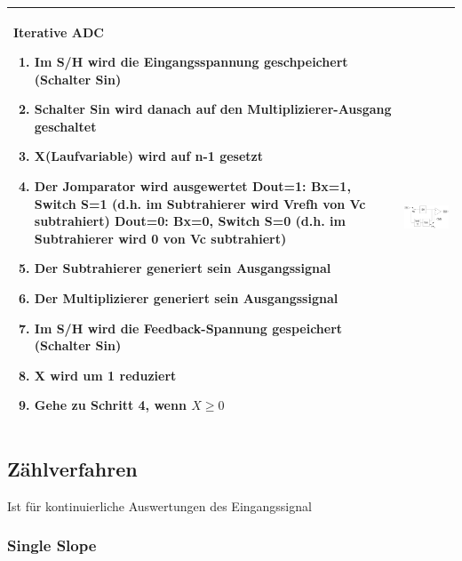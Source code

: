 \begin{longtable}{|p{12cm}|c|}
  {\textbf{Iterative ADC} \newline
  \begin{enumerate}
    \item Im S/H wird die Eingangsspannung geschpeichert (Schalter Sin)
    \item Schalter Sin wird danach auf den Multiplizierer-Ausgang geschaltet
    \item X(Laufvariable) wird auf n-1 gesetzt
    \item Der Jomparator wird ausgewertet\newline
      Dout=1: Bx=1, Switch S=1 (d.h. im Subtrahierer wird Vrefh von Vc
      subtrahiert)\newline
      Dout=0: Bx=0, Switch S=0 (d.h. im Subtrahierer wird 0 von Vc
      subtrahiert)
    \item Der Subtrahierer generiert sein Ausgangssignal
    \item Der Multiplizierer generiert sein Ausgangssignal
    \item Im S/H wird die Feedback-Spannung gespeichert (Schalter Sin)
    \item X wird um 1 reduziert
    \item Gehe zu Schritt 4, wenn $X\geq0$
  \end{enumerate}
  }
  &
  \includegraphics[width=6cm, valign=t]{pictures/iterativeADC}\\
\hline
\end{longtable}



\subsection{Zählverfahren } 
Ist für kontinuierliche Auswertungen des Eingangssignal
\subsubsection{Single Slope}

